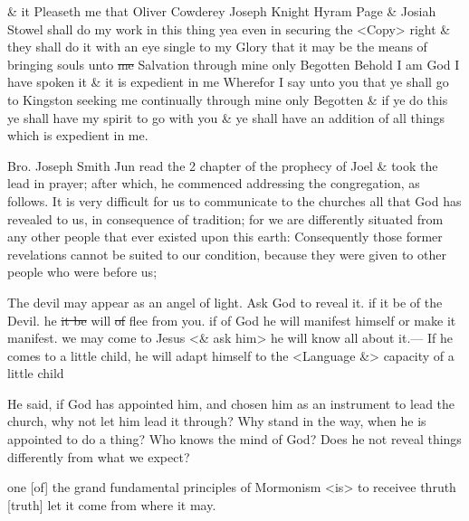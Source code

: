 		\begin{compactdesc}
		
			\item[{\hyperlink{EMS-1830-JS-CIR-EARLY-1830-c}{Circa early 1830}}] \& it Pleaseth me that Oliver Cowderey Joseph Knight Hyram Page \& Josiah Stowel shall do my work in this thing yea even in securing the <Copy> right \& they shall do it with an eye single to my Glory that it may be the means of bringing souls unto \sout{me} Salvation through mine only Begotten Behold I am God I have spoken it \& it is expedient in me Wherefor I say unto you that ye shall go to Kingston seeking me continually through mine only Begotten \& if ye do this ye shall have my spirit to go with you \& ye shall have an addition of all things which is expedient in me.
		
			\item[{\hyperlink{EMS-1834-JS-21-APR-1834-a}{21 April 1834}}] Bro. Joseph Smith Jun read the 2 chapter of the prophecy of Joel \& took the lead in prayer; after which, he commenced addressing the congregation, as follows. It is very difficult for us to communicate to the churches all that God has revealed to us, in consequence of tradition; for we are differently situated from any other people that ever existed upon this earth: Consequently those former revelations cannot be suited to our condition, because they were given to other people who were before us;
		
			\item[{\hyperref[EMS-1839-JS-CIR-26-JUN-CIR-4-AUG-1839-A-WR]{Between circa 26 June and circa 4 August 1839--A}}] The devil may appear as an angel of light. Ask God to reveal it. if it be of the Devil. he \sout{it be} will \sout{of} flee from you. if of God he will manifest himself or make it manifest. we may come to Jesus <\& ask him> he will know all about it.--- If he comes to a little child, he will adapt himself to the <Language \&> capacity of a little child
			
			\item[{\hyperlink{EMS-1842-JS-28-APR-1842-g}{28 April 1842}}] He said, if God has appointed him, and chosen him as an instrument to lead the church, why not let him lead it through? Why stand in the way, when he is appointed to do a thing? Who knows the mind of God? Does he not reveal things differently from what we expect?
			
			\item[{\hyperlink{EMS-1843-JS-9-JUL-1843-WR-b}{9 July 1843 WR-b}}] one [of] the grand fundamental principles of Mormonism <is> to receivee thruth [truth] let it come from where it may.
			
		\end{compactdesc}
	
